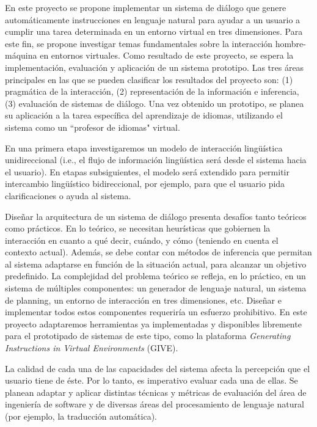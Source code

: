 
En este proyecto se propone implementar un sistema de di\'alogo que genere
autom\'aticamente
instrucciones en lenguaje natural para ayudar a un usuario a cumplir una tarea
determinada en un entorno virtual 
en tres dimensiones. Para este fin, se propone investigar temas fundamentales
sobre la
in\-teracci\'on hombre-m\'aquina 
en entornos virtuales. Como resultado de este proyecto, se espera la
implementaci\'on, evaluaci\'on y aplicaci\'on de un sistema prototipo. Las tres
\'areas principales en las que se pueden clasificar los resultados del proyecto
son: (1) pragm\'atica de la interacci\'on, (2) representaci\'on
de la informaci\'on e inferencia, (3) evaluaci\'on de sistemas
de di\'alogo. Una vez obtenido
un prototipo, se planea su aplicaci\'on a la tarea espec\'ifica del 
aprendizaje de idiomas, utilizando el sistema como un ``profesor de idiomas"
virtual.

En una primera etapa investigaremos un modelo de interacci\'on 
ling\"u\'istica unidireccional
(i.e., el flujo de informaci\'on ling\"u\'istica ser\'a desde el sistema hacia
el usuario).
En etapas subsiguientes, el modelo ser\'a extendido para
permitir intercambio ling\"u\'istico bidireccional, por ejemplo, para que el
usuario pida clarificaciones o ayuda al sistema.

Dise\~nar la arquitectura de un sistema de di\'alogo presenta
desaf\'ios tanto te\'oricos como pr\'acticos. En lo te\'orico, se necesitan
heur\'isticas que gobiernen la interacci\'on en cuanto a qu\'e decir,
cu\'ando, y c\'omo (teniendo en cuenta el contexto actual). Adem\'as, se debe
contar con m\'etodos
de inferencia que permitan al sistema adaptarse en funci\'on de la situaci\'on
actual, para alcanzar un objetivo predefinido.
La complejidad del problema te\'orico se
refleja, en lo pr\'actico, en un sistema de m\'ultiples componentes: un
generador de lenguaje natural, un sistema de planning, un entorno de 
interacci\'on en tres dimensiones, etc.
Dise\~nar e implementar todos estos componentes requerir\'ia un esfuerzo
prohibitivo. En este proyecto adaptaremos herramientas ya
implementadas y disponibles libremente para el prototipado de sistemas de este
tipo, como la plataforma \emph{Generating Instructions in Virtual
Environments} (GIVE).

La calidad de cada una de las capacidades del sistema afecta la
percepci\'on que el usuario tiene de \'este. Por lo tanto, es imperativo
evaluar cada una de ellas.
Se planean adaptar y aplicar distintas t\'ecnicas y m\'etricas de evaluaci\'on
del \'area de ingenier\'ia de software y de diversas \'areas del procesamiento
de lenguaje natural (por ejemplo, la traducci\'on autom\'atica).
